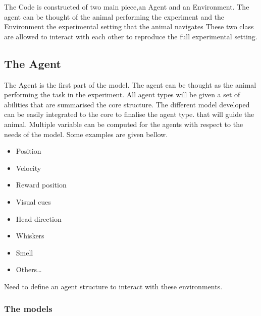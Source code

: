 \documentclass{article}
\begin{document}
The Code is constructed of two main piece,an Agent and an Environment. The agent can be thought of the animal performing the experiment and the Environment the experimental setting that the animal navigates These two class are allowed to interact with each other to reproduce the full experimental setting.

\subsection{The Agent}

The Agent is the first part of the model. The agent can be thought as the animal performing the task in the experiment. All agent types will be given a set of abilities that are summarised the core structure. The different model developed can be easily integrated to the core to finalise the agent type. that will guide the animal.
Multiple variable can be computed for the agents with respect to the needs of the model. Some examples are given bellow.

\begin{itemize}


\item Position
\item Velocity
\item Reward position
\item Visual cues
\item Head direction
\item Whiskers
\item Smell
\item Others…
\end{itemize}
Need to define an agent structure to interact with these environments.


\subsubsection{The models}
\end{document}
